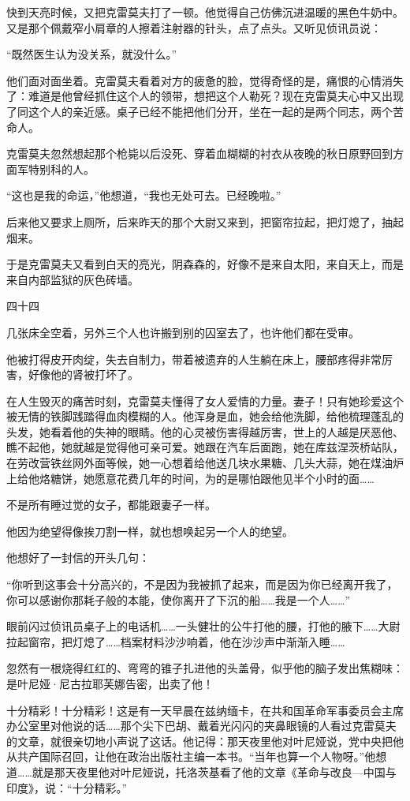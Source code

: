 快到天亮时候，又把克雷莫夫打了一顿。他觉得自己仿佛沉进温暖的黑色牛奶中。又是那个佩戴窄小肩章的人擦着注射器的针头，点了点头。又听见侦讯员说：

“既然医生认为没关系，就没什么。”

他们面对面坐着。克雷莫夫看着对方的疲惫的脸，觉得奇怪的是，痛恨的心情消失了：难道是他曾经抓住这个人的领带，想把这个人勒死？现在克雷莫夫心中又出现了同这个人的亲近感。桌子已经不能把他们分开，坐在一起的是两个同志，两个苦命人。

克雷莫夫忽然想起那个枪毙以后没死、穿着血糊糊的衬衣从夜晚的秋日原野回到方面军特别科的人。

“这也是我的命运，”他想道，“我也无处可去。已经晚啦。”

后来他又要求上厕所，后来昨天的那个大尉又来到，把窗帘拉起，把灯熄了，抽起烟来。

于是克雷莫夫又看到白天的亮光，阴森森的，好像不是来自太阳，来自天上，而是来自内部监狱的灰色砖墙。

四十四

几张床全空着，另外三个人也许搬到别的囚室去了，也许他们都在受审。

他被打得皮开肉绽，失去自制力，带着被遗弃的人生躺在床上，腰部疼得非常厉害，好像他的肾被打坏了。

在人生毁灭的痛苦时刻，克雷莫夫懂得了女人爱情的力量。妻子！只有她珍爱这个被无情的铁脚践踏得血肉模糊的人。他浑身是血，她会给他洗脚，给他梳理蓬乱的头发，她看着他的失神的眼睛。他的心灵被伤害得越厉害，世上的人越是厌恶他、瞧不起他，她就越是觉得他可亲可爱。她跟在汽车后面跑，她在库兹涅茨桥站队，在劳改营铁丝网外面等候，她一心想着给他送几块水果糖、几头大蒜，她在煤油炉上给他烙糖饼，她愿意花费几年的时间，为的是哪怕跟他见半个小时的面……

不是所有睡过觉的女子，都能跟妻子一样。

他因为绝望得像挨刀割一样，就也想唤起另一个人的绝望。

他想好了一封信的开头几句：

“你听到这事会十分高兴的，不是因为我被抓了起来，而是因为你已经离开我了，你可以感谢你那耗子般的本能，使你离开了下沉的船……我是一个人……”

眼前闪过侦讯员桌子上的电话机……一头健壮的公牛打他的腰，打他的腋下……大尉拉起窗帘，把灯熄了……档案材料沙沙响着，他在沙沙声中渐渐入睡……

忽然有一根烧得红红的、弯弯的锥子扎进他的头盖骨，似乎他的脑子发出焦糊味：是叶尼娅·尼古拉耶芙娜告密，出卖了他！

十分精彩！十分精彩！这是有一天早晨在兹纳缅卡，在共和国革命军事委员会主席办公室里对他说的话……那个尖下巴胡、戴着光闪闪的夹鼻眼镜的人看过克雷莫夫的文章，就很亲切地小声说了这话。他记得：那天夜里他对叶尼娅说，党中央把他从共产国际召回，让他在政治出版社主编一本书。“当年也算一个人物呀。”他想道……就是那天夜里他对叶尼娅说，托洛茨基看了他的文章《革命与改良—中国与印度》，说：“十分精彩。”

